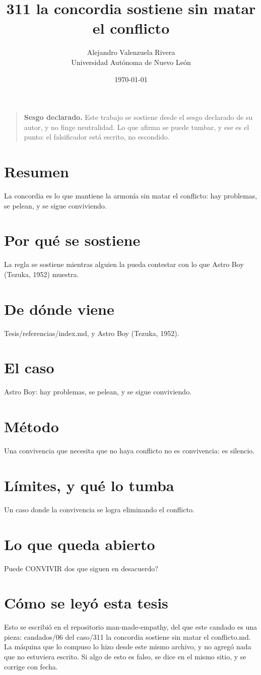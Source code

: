 \documentclass[11pt,a4paper]{article}
\title{311 la concordia sostiene sin matar el conflicto}
\author{Alejandro Valenzuela Rivera\\\small Universidad Autónoma de Nuevo León}
\date{\today}
\begin{document}
\maketitle

\begin{quote}
\textbf{Sesgo declarado.} Este trabajo se sostiene desde el sesgo declarado de su autor, y no finge neutralidad. Lo que afirma se puede tumbar, y ese es el punto: el falsificador está escrito, no escondido.
\end{quote}

\section*{Resumen}
La concordia es lo que mantiene la armonía sin matar el conflicto: hay problemas, se pelean, y se sigue conviviendo.

\section{Por qué se sostiene}
La regla se sostiene mientras alguien la pueda contestar con lo que Astro Boy (Tezuka, 1952) muestra.

\section{De dónde viene}
Tesis/referencias/index.md, y Astro Boy (Tezuka, 1952).

\section{El caso}
Astro Boy: hay problemas, se pelean, y se sigue conviviendo.

\section{Método}
Una convivencia que necesita que no haya conflicto no es convivencia: es silencio.

\section{Límites, y qué lo tumba}
Un caso donde la convivencia se logra eliminando el conflicto.

\section{Lo que queda abierto}
\textquestiondown{}Puede CONVIVIR dos que siguen en desacuerdo?

\section*{Cómo se leyó esta tesis}
Esto se escribió en el repositorio man-made-empathy, del que este candado es una pieza: candados/06 del caso/311 la concordia sostiene sin matar el conflicto.md. La máquina que lo compuso lo hizo desde este mismo archivo, y no agregó nada que no estuviera escrito. Si algo de esto es falso, se dice en el mismo sitio, y se corrige con fecha.
\end{document}
